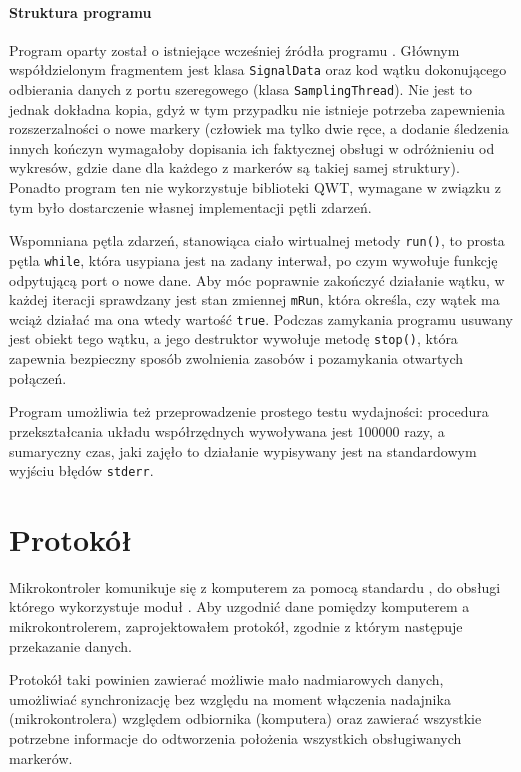 \paragraph{Struktura programu}
Program oparty został o istniejące wcześniej źródła programu . Głównym współdzielonym fragmentem jest klasa \verb|SignalData| oraz kod wątku dokonującego odbierania danych z portu szeregowego (klasa \verb|SamplingThread|). Nie jest to jednak dokładna kopia, gdyż w tym przypadku nie istnieje potrzeba zapewnienia rozszerzalności o nowe markery (człowiek ma tylko dwie ręce, a dodanie śledzenia innych kończyn wymagałoby dopisania ich faktycznej obsługi \ppauza w odróżnieniu od wykresów, gdzie dane dla każdego z markerów są takiej samej struktury). Ponadto program ten nie wykorzystuje biblioteki \textsc{QWT}, wymagane w związku z tym było dostarczenie własnej implementacji pętli zdarzeń.

Wspomniana pętla zdarzeń, stanowiąca ciało wirtualnej metody \verb|run()|, to prosta pętla \verb|while|, która usypiana jest na zadany interwał, po czym wywołuje funkcję odpytującą port o nowe dane. Aby móc poprawnie zakończyć działanie wątku, w każdej iteracji sprawdzany jest stan zmiennej \verb|mRun|, która określa, czy wątek ma wciąż działać \ppauza ma ona wtedy wartość \verb|true|. Podczas zamykania programu usuwany jest obiekt tego wątku, a jego destruktor wywołuje metodę \verb|stop()|, która zapewnia bezpieczny sposób zwolnienia zasobów i pozamykania otwartych połączeń.

Program umożliwia też przeprowadzenie prostego testu wydajności: procedura przekształcania układu współrzędnych wywoływana jest 100000 razy, a sumaryczny czas, jaki zajęło to działanie wypisywany jest na standardowym wyjściu błędów \verb|stderr|.

\section{Protokół}
\label{sec:protocol}
Mikrokontroler komunikuje się z komputerem za pomocą standardu , do obsługi którego wykorzystuje moduł . Aby uzgodnić dane pomiędzy komputerem a mikrokontrolerem, zaprojektowałem protokół, zgodnie z którym następuje przekazanie danych.

Protokół taki powinien zawierać możliwie mało nadmiarowych danych, umożliwiać synchronizację bez względu na moment włączenia nadajnika (mikrokontrolera) względem odbiornika (komputera) oraz zawierać wszystkie potrzebne informacje do odtworzenia położenia wszystkich obsługiwanych markerów.

